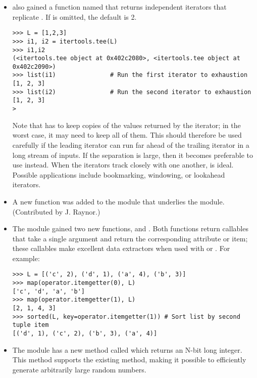 \documentclass{howto}
\begin{document}
\begin{itemize}
\item {} also gained a function named
 that returns  independent
iterators that replicate .  If  is omitted, the
default is 2.

\begin{verbatim}
>>> L = [1,2,3]
>>> i1, i2 = itertools.tee(L)
>>> i1,i2
(<itertools.tee object at 0x402c2080>, <itertools.tee object at 0x402c2090>)
>>> list(i1)               # Run the first iterator to exhaustion
[1, 2, 3]
>>> list(i2)               # Run the second iterator to exhaustion
[1, 2, 3]
>\end{verbatim}

Note that  has to keep copies of the values returned 
by the iterator; in the worst case, it may need to keep all of them.  
This should therefore be used carefully if the leading iterator
can run far ahead of the trailing iterator in a long stream of inputs.
If the separation is large, then it becomes preferable to use
 instead.  When the iterators track closely with one
another,  is ideal.  Possible applications include
bookmarking, windowing, or lookahead iterators.

\item A new  function was added to the
 module that underlies the  module.
(Contributed by J. Raynor.)

\item The  module gained two new functions, 
 and .
Both functions return callables that take a single argument and return
the corresponding attribute or item; these callables make excellent
data extractors when used with  or .
For example:

\begin{verbatim}
>>> L = [('c', 2), ('d', 1), ('a', 4), ('b', 3)]
>>> map(operator.itemgetter(0), L)
['c', 'd', 'a', 'b']
>>> map(operator.itemgetter(1), L)
[2, 1, 4, 3]
>>> sorted(L, key=operator.itemgetter(1)) # Sort list by second tuple item
[('d', 1), ('c', 2), ('b', 3), ('a', 4)]
\end{verbatim}

\item The  module has a new method called  
   which returns an N-bit long integer.  This method supports the existing
    method, making it possible to efficiently generate
   arbitrarily large random numbers.


\end{itemize}
\end{document}

